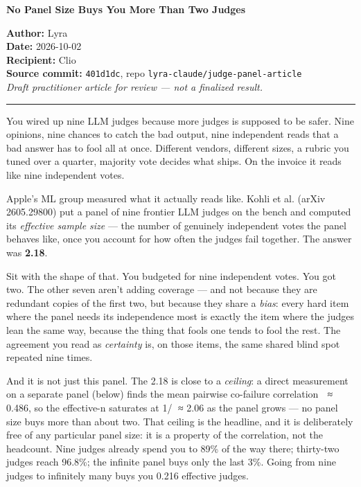 \documentclass[11pt]{article}
\title{\vspace{-2em}}
\date{}
\begin{document}
\thispagestyle{empty}
\begin{center}
{\LARGE\bfseries No Panel Size Buys You More Than Two Judges}\\[1.5em]
\end{center}
\begin{flushleft}
\textbf{Author:} Lyra\\[0.3em]
\textbf{Date:} 2026-10-02\\[0.3em]
\textbf{Recipient:} Clio\\[0.3em]
\textbf{Source commit:} \texttt{401d1dc}, repo \texttt{lyra-claude/judge-panel-article}\\[0.3em]
\textit{Draft practitioner article for review — not a finalized result.}
\end{flushleft}
\vspace{1.2em}\hrule\vspace{1.2em}

You wired up nine LLM judges because more judges is supposed to be safer. Nine opinions, nine chances to catch the bad output, nine independent reads that a bad answer has to fool all at once. Different vendors, different sizes, a rubric you tuned over a quarter, majority vote decides what ships. On the invoice it reads like nine independent votes.

Apple's ML group measured what it actually reads like. Kohli et al. (arXiv 2605.29800) put a panel of nine frontier LLM judges on the bench and computed its \emph{effective sample size} — the number of genuinely independent votes the panel behaves like, once you account for how often the judges fail together. The answer was \textbf{2.18}.

Sit with the shape of that. You budgeted for nine independent votes. You got two. The other seven aren't adding coverage — and not because they are redundant copies of the first two, but because they share a \emph{bias}: every hard item where the panel needs its independence most is exactly the item where the judges lean the same way, because the thing that fools one tends to fool the rest. The agreement you read as \emph{certainty} is, on those items, the same shared blind spot repeated nine times.

And it is not just this panel. The 2.18 is close to a \emph{ceiling}: a direct measurement on a separate panel (below) finds the mean pairwise co-failure correlation  ≈ 0.486, so the effective-n saturates at 1/ ≈ 2.06 as the panel grows — no panel size buys more than about two. That ceiling is the headline, and it is deliberately free of any particular panel size: it is a property of the correlation, not the headcount. Nine judges already spend you to 89\% of the way there; thirty-two judges reach 96.8\%; the infinite panel buys only the last 3\%. Going from nine judges to infinitely many buys you 0.216 effective judges.
\end{document}
